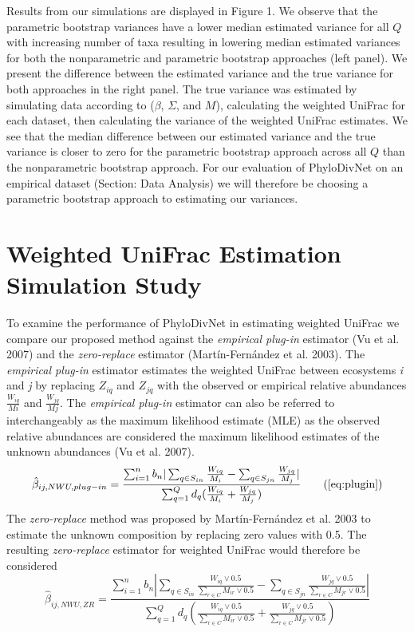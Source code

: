\documentclass{article}
\newcommand*{\myfont}{\fontfamily{lmtt}\selectfont}
\begin{document}
Results from our simulations are displayed in Figure 1. We observe that the parametric bootstrap variances have a lower median estimated variance for all $Q$ with increasing number of taxa resulting in lowering median estimated variances for both the nonparametric and parametric bootstrap approaches (left panel). We present the difference between the estimated variance and the true variance for both approaches in the right panel. The true variance was estimated by simulating data according to ($\beta$, $\Sigma$, and $M$), calculating the weighted UniFrac for each dataset, then calculating the variance of the weighted UniFrac estimates. We see that the median difference between our estimated variance and the true variance is closer to zero for the parametric bootstrap approach across all $Q$ than the nonparametric bootstrap approach. For our evaluation of {\myfont PhyloDivNet} on an empirical dataset (Section: Data Analysis) we will therefore be choosing a parametric bootstrap approach to estimating our variances.

\section{Weighted UniFrac Estimation Simulation Study}
To examine the performance of {\myfont PhyloDivNet} in estimating weighted UniFrac we compare our proposed method against the  \textit{empirical plug-in} estimator (Vu et al. 2007) and the \textit{zero-replace} estimator (Mart\'in-Fern\'andez et al. 2003). The  \textit{empirical plug-in} estimator estimates the weighted UniFrac between ecosystems \textit{i} and \textit{j} by replacing $Z_{iq}$ and $Z_{jq}$ with the observed or empirical relative abundances $\frac{W_{iq}}{Mi}$ and $\frac{W_{jq}}{Mj}$. The \textit{empirical plug-in} estimator can also be referred to interchangeably as the maximum likelihood estimate (MLE) as the observed relative abundances are considered the maximum likelihood estimates of the unknown abundances (Vu et al. 2007).
\begin{equation*}
    \hat{\beta}_{ij,NWU,plug-in}=\frac{\sum_{i=1}^n b_n |\sum_{q \in S_{in}} \frac{W_{iq}}{M_i}-\sum_{q \in S_{jn}} \frac{W_{jq}}{M_j}|}{\sum_{q=1}^Q d_q (\frac{W_{iq}}{M_i}+\frac{W_{jq}}{M_j})} \tag{\ref{eq:plugin}}
\end{equation*}
The \textit{zero-replace} method was proposed by Mart\'in-Fern\'andez et al. 2003 to estimate the unknown composition by replacing zero values with 0.5. The resulting \textit{zero-replace} estimator for weighted UniFrac would therefore be considered
\begin{equation}
    \hat{\beta}_{ij,NWU,ZR}=\frac{\sum_{i=1}^n b_n |\sum_{q \in S_{in}} \frac{W_{iq}\vee0.5}{\sum_{r \in C} M_{ir} \vee0.5}-\sum_{q \in S_{jn}} \frac{W_{jq}\vee0.5}{\sum_{r \in C}M_{jr}\vee0.5}|}{\sum_{q=1}^Q d_q (\frac{W_{iq}\vee0.5}{\sum_{r \in C} M_{ir} \vee0.5}+\frac{W_{jq}\vee0.5}{\sum_{r \in C}M_{jr}\vee0.5})}
\end{equation}
\end{document}
